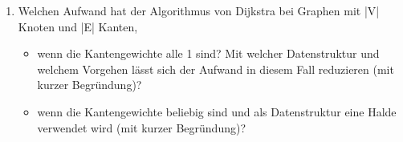 \documentclass{bschlangaul-aufgabe}
\begin{document}
\begin{enumerate}

\item Welchen Aufwand hat der Algorithmus von Dijkstra bei Graphen mit
|V| Knoten und |E| Kanten,

\begin{itemize}
\item wenn die Kantengewichte alle 1 sind? Mit welcher Datenstruktur und
welchem Vorgehen lässt sich der Aufwand in diesem Fall reduzieren (mit
kurzer Begründung)?

\item wenn die Kantengewichte beliebig sind und als Datenstruktur eine
Halde verwendet wird (mit kurzer Begründung)?
\end{itemize}

\end{enumerate}
\end{document}

